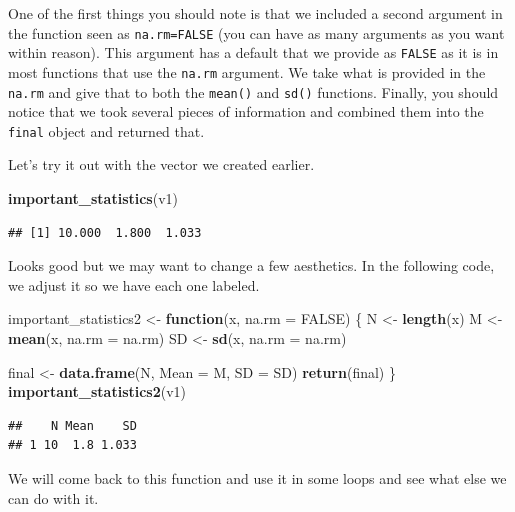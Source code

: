 \documentclass[]{tufte-book}
\newenvironment{Shaded}{}{}
\newcommand{\KeywordTok}[1]{\textcolor[rgb]{0.00,0.44,0.13}{\textbf{#1}}}
\newcommand{\DataTypeTok}[1]{\textcolor[rgb]{0.56,0.13,0.00}{#1}}
\newcommand{\StringTok}[1]{\textcolor[rgb]{0.25,0.44,0.63}{#1}}
\newcommand{\OtherTok}[1]{\textcolor[rgb]{0.00,0.44,0.13}{#1}}
\newcommand{\ControlFlowTok}[1]{\textcolor[rgb]{0.00,0.44,0.13}{\textbf{#1}}}
\newcommand{\NormalTok}[1]{#1}
\theoremstyle{definition}
\theoremstyle{definition}
\theoremstyle{remark}
\begin{document}
One of the first things you should note is that we included a second
argument in the function seen as \texttt{na.rm=FALSE} (you can have as
many arguments as you want within reason). This argument has a default
that we provide as \texttt{FALSE} as it is in most functions that use
the \texttt{na.rm} argument. We take what is provided in the
\texttt{na.rm} and give that to both the \texttt{mean()} and
\texttt{sd()} functions. Finally, you should notice that we took several
pieces of information and combined them into the \texttt{final} object
and returned that.

Let's try it out with the vector we created earlier.

\begin{Shaded}
\begin{Highlighting}[]
\KeywordTok{important_statistics}\NormalTok{(v1)}
\end{Highlighting}
\end{Shaded}

\begin{verbatim}
## [1] 10.000  1.800  1.033
\end{verbatim}

Looks good but we may want to change a few aesthetics. In the following
code, we adjust it so we have each one labeled.

\begin{Shaded}
\begin{Highlighting}[]
\NormalTok{important_statistics2 <-}\StringTok{ }\ControlFlowTok{function}\NormalTok{(x, }\DataTypeTok{na.rm =} \OtherTok{FALSE}\NormalTok{) \{}
\NormalTok{    N <-}\StringTok{ }\KeywordTok{length}\NormalTok{(x)}
\NormalTok{    M <-}\StringTok{ }\KeywordTok{mean}\NormalTok{(x, }\DataTypeTok{na.rm =}\NormalTok{ na.rm)}
\NormalTok{    SD <-}\StringTok{ }\KeywordTok{sd}\NormalTok{(x, }\DataTypeTok{na.rm =}\NormalTok{ na.rm)}
    
\NormalTok{    final <-}\StringTok{ }\KeywordTok{data.frame}\NormalTok{(N, }\DataTypeTok{Mean =}\NormalTok{ M, }\DataTypeTok{SD =}\NormalTok{ SD)}
    \KeywordTok{return}\NormalTok{(final)}
\NormalTok{\}}
\KeywordTok{important_statistics2}\NormalTok{(v1)}
\end{Highlighting}
\end{Shaded}

\begin{verbatim}
##    N Mean    SD
## 1 10  1.8 1.033
\end{verbatim}

We will come back to this function and use it in some loops and see what
else we can do with it.
\end{document}
